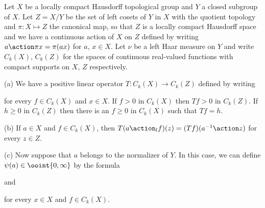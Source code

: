{} Let $X$ be a locally compact Hausdorff topological
group and $Y$ a closed subgroup of $X$.   Let $Z=X/Y$ be the set of left
cosets of $Y$ in $X$ with the quotient topology and $\pi:X\mapsto Z$ the
canonical map, so that $Z$ is a
locally compact Hausdorff space and we have a continuous action of $X$
on $Z$ defined by writing $a\action\pi x=\pi(ax)$ for $a$,
$x\in X$.   Let $\nu$ be a left Haar measure on $Y$
and write $C_k(X)$, $C_k(Z)$ for the spaces of continuous
real-valued functions with compact supports on $X$, $Z$ respectively.

(a) We have a positive linear operator $T:C_k(X)\to C_k(Z)$
defined by writing


\noindent for every $f\in C_k(X)$ and $x\in X$.   If $f>0$ in $C_k(X)$
then $Tf>0$ in $C_k(Z)$.
If $h\ge 0$ in $C_k(Z)$ then there is an $f\ge 0$ in $C_k(X)$ such
that $Tf=h$.

(b) If $a\in X$ and $f\in C_k(X)$, then
$T(a\action_lf)(z)=(Tf)(a^{-1}\action z)$ for every $z\in Z$.

(c) Now suppose that $a$ belongs to the normalizer of
$Y$.   In this case, we can define
$\psi(a)\in\ooint{0,\infty}$ by the formula


\noindent and


\noindent for every $x\in X$ and $f\in C_k(X)$.

